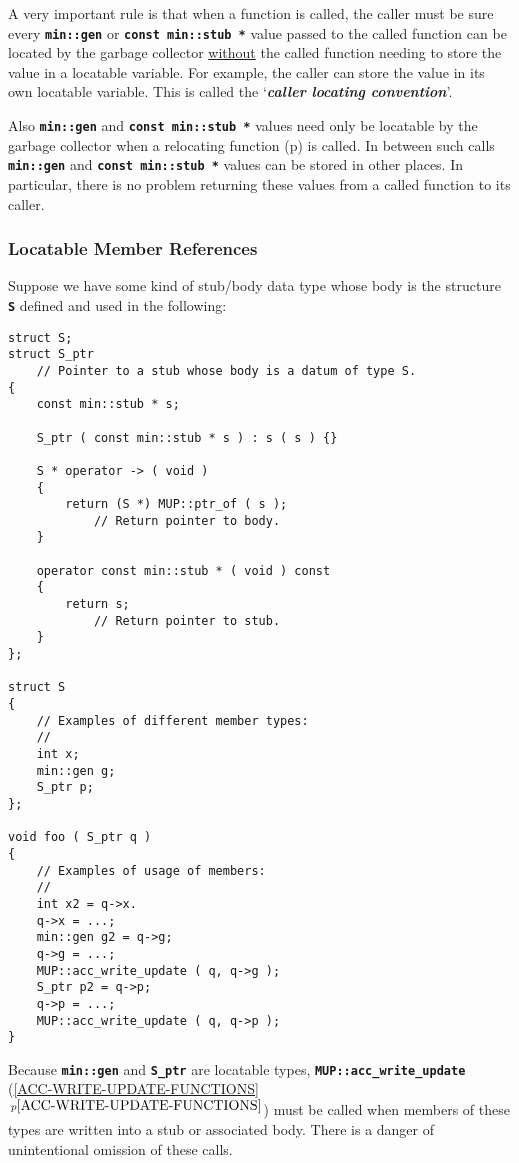 \documentclass[12pt]{article}
\newcommand{\TT}[1]{{\tt \bfseries #1}}
\newcommand{\key}[1]{{\bf \em #1}\index{#1}}
\newcommand{\itemref}[1]{\ref{#1}$\,^{p\pageref{#1}}$}
\newcommand{\pagref}[1]{p\pageref{#1}}
\newcommand{\EOL}{\penalty \exhyphenpenalty}
\newenvironment{indpar}[1][0.3in]%
	{\begin{list}{}%
		     {\setlength{\itemsep}{0in}%
		      \setlength{\topsep}{0in}%
		      \setlength{\parsep}{1ex}%
		      \setlength{\labelwidth}{#1}%
		      \setlength{\leftmargin}{#1}%
		      \addtolength{\leftmargin}{\labelsep}}%
	 \item}%
	{\end{list}}
\begin{document}
A very important rule is that when a function is called, the caller
must be sure every \TT{min::gen}
or \TT{const min::\EOL stub~*} value passed to the called
function can be located by the garbage collector \underline{without} the called
function needing to store the value in a locatable variable.
For example, the caller can store the value in its own locatable
variable.  This is called the `\key{caller locating convention}'.

Also \TT{min::gen} and \TT{const min::\EOL stub~*}
values need only be locatable by
the garbage collector when a relocating function (\pagref{RELOCATING-FUNCTIONS})
is called.  In between such calls \TT{min::gen}
and \TT{const min::\EOL stub *} values can be
stored in other places.  In particular, there is no problem
returning these values from a called function to its caller.

\subsubsection{Locatable Member References}
\label{LOCATABLE-MEMBER-REFERENCES}

Suppose we have some kind of stub/body data type whose body
is the structure \TT{S} defined and used in the following:

\begin{indpar}\begin{verbatim}
struct S;
struct S_ptr
    // Pointer to a stub whose body is a datum of type S.
{
    const min::stub * s;

    S_ptr ( const min::stub * s ) : s ( s ) {}

    S * operator -> ( void )
    {
        return (S *) MUP::ptr_of ( s );
            // Return pointer to body.
    }

    operator const min::stub * ( void ) const
    {
        return s;
            // Return pointer to stub.
    }
};

struct S
{
    // Examples of different member types:
    //
    int x;
    min::gen g;
    S_ptr p;
};

void foo ( S_ptr q )
{
    // Examples of usage of members:
    //
    int x2 = q->x.
    q->x = ...;
    min::gen g2 = q->g;
    q->g = ...;
    MUP::acc_write_update ( q, q->g );
    S_ptr p2 = q->p;
    q->p = ...;
    MUP::acc_write_update ( q, q->p );
}
\end{verbatim}\end{indpar}

Because \TT{min::gen} and \TT{S\_ptr} are locatable types,
\TT{MUP::\EOL acc\_\EOL write\_\EOL update}
(\itemref{ACC-WRITE-UPDATE-FUNCTIONS}) must be called when
members of these types are written into a stub or associated body.  There is
a danger of unintentional omission of these calls.
\end{document}
